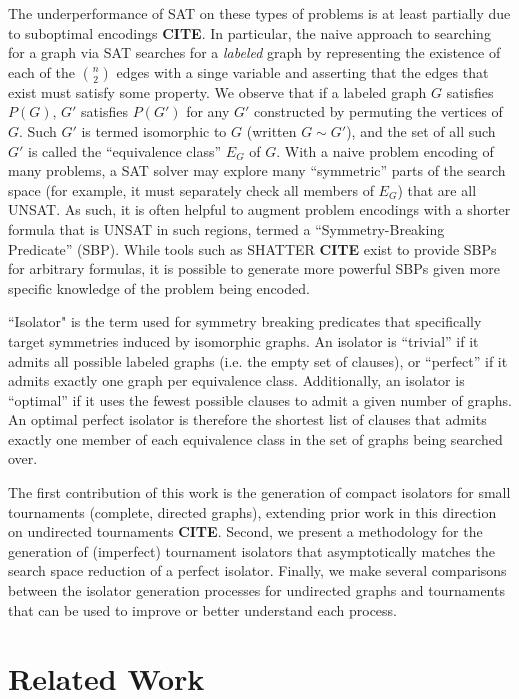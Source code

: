 \documentclass[a4paper,UKenglish,cleveref, autoref, thm-restate]{lipics-v2021}
\begin{document}
The underperformance of SAT on these types of problems is at least partially due to suboptimal encodings \textbf{CITE}. In particular, the naive approach to searching for a graph via SAT searches for a \textit{labeled} graph by representing the existence of each of the $n \choose 2$ edges with a singe variable and asserting that the edges that exist must satisfy some property. We observe that if a labeled graph $G$ satisfies $P(G)$, $G'$ satisfies $P(G')$ for any $G'$ constructed by permuting the vertices of $G$. Such $G'$ is termed isomorphic to $G$ (written $G\sim G'$), and the set of all such $G'$ is called the ``equivalence class'' $E_G$ of $G$. With a naive problem encoding of many problems, a SAT solver may explore many ``symmetric'' parts of the search space (for example, it must separately check all members of $E_G$) that are all UNSAT. As such, it is often helpful to augment problem encodings with a shorter formula that is UNSAT in such regions, termed a ``Symmetry-Breaking Predicate'' (SBP). While tools such as SHATTER \textbf{CITE} exist to provide SBPs for arbitrary formulas, it is possible to generate more powerful SBPs given more specific knowledge of the problem being encoded.

 ``Isolator" is the term used for symmetry breaking predicates that specifically target symmetries induced by isomorphic graphs. An isolator is ``trivial'' if it admits all possible labeled graphs (i.e. the empty set of clauses), or ``perfect'' if it admits exactly one graph per equivalence class. Additionally, an isolator is ``optimal'' if it uses the fewest possible clauses to admit a given number of graphs. An optimal perfect isolator is therefore the shortest list of clauses that admits exactly one member of each equivalence class in the set of graphs being searched over.

The first contribution of this work is the generation of compact isolators for small tournaments (complete, directed graphs), extending prior work in this direction on undirected tournaments \textbf{CITE}. Second, we present a methodology for the generation of (imperfect) tournament isolators that asymptotically matches the search space reduction of a perfect isolator. Finally, we make several comparisons between the isolator generation processes for undirected graphs and tournaments that can be used to improve or better understand each process.
\section{Related Work}
\end{document}
